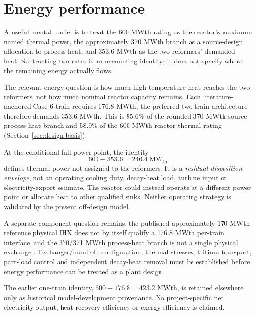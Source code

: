 \section{Energy performance}\label{sec:energy-performance}

A useful mental model is to treat the 600 MWth rating as the reactor's maximum named thermal power, the approximately 370 MWth branch as a source-design allocation to process heat, and 353.6 MWth as the two reformers' demanded heat. Subtracting two rates is an accounting identity; it does not specify where the remaining energy actually flows.

The relevant energy question is how much high-temperature heat reaches the two reformers, not how much nominal reactor capacity remains. Each literature-anchored Case-6 train requires 176.8 MWth; the preferred two-train architecture therefore demands 353.6 MWth. This is 95.6\% of the rounded 370 MWth source process-heat branch and 58.9\% of the 600 MWth reactor thermal rating (Section~\ref{sec:design-basis}).

At the conditional full-power point, the identity
\[
600-353.6=246.4~\mathrm{MW_{th}}
\]
defines thermal power not assigned to the reformers. It is a \emph{residual-disposition envelope}, not an operating cooling duty, decay-heat load, turbine input or electricity-export estimate. The reactor could instead operate at a different power point or allocate heat to other qualified sinks. Neither operating strategy is validated by the present off-design model.

A separate component question remains: the published approximately 170 MWth reference physical IHX does not by itself qualify a 176.8 MWth per-train interface, and the 370/371 MWth process-heat branch is not a single physical exchanger. Exchanger/manifold configuration, thermal stresses, tritium transport, part-load control and independent decay-heat removal must be established before energy performance can be treated as a plant design.

The earlier one-train identity, $600-176.8=423.2$ MWth, is retained elsewhere only as historical model-development provenance. No project-specific net electricity output, heat-recovery efficiency or exergy efficiency is claimed.
